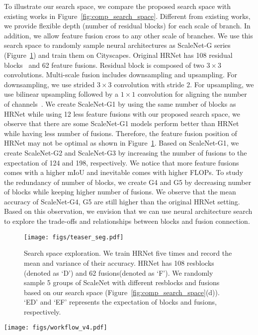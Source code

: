 \documentclass[final]{cvpr}
\newcommand{\workname}{ScaleNAS\xspace}
\newcommand{\netname}{ScaleNet\xspace}
\newcommand{\supernet}{SuperScaleNet\xspace}
\begin{document}
To illustrate our search space, we compare the proposed search space with existing works in Figure~\ref{fig:comp_search_space}.
Different from existing works, we provide flexible depth (number of residual blocks) for each scale of branch. In addition, we allow feature fusion cross to any other scale of branches.
We use this search space to randomly sample neural architectures as \netname-G series (Figure~\ref{fig:teaser_seg}) and train them on Cityscapes.
Original HRNet has 108 residual blocks~\cite{he2016deep} and 62 feature fusions. 
Residual block is composed of two $3\times3$ convolutions. Multi-scale fusion includes downsampling and upsampling. For downsampling, we use strided $3 \times 3$ convolution with stride 2. For upsampling, we use bilinear upsampling followed by a $1\times1$  convolution for aligning the number of channels~\cite{wang2020deep}.
We create ScaleNet-G1 by using the same number of blocks as HRNet while 
using 12 less feature fusions with our proposed search space, we observe that there are some ScaleNet-G1 models perform better than HRNet while having less number of fusions. Therefore, the feature fusion position of HRNet may not be optimal as shown in Figure~\ref{fig:teaser_seg}.
Based on \netname -G1, we create \netname -G2 and \netname -G3 by increasing the number of fusions to the expectation of 124 and 198, respectively. We notice that more feature fusions comes with a higher mIoU and inevitable comes with higher FLOPs. To study the redundancy of number of blocks, we create G4 and G5 by decreasing number of blocks while keeping higher number of fusions. We observe that the mean accuracy of \netname -G4, G5 are still higher than the original HRNet setting. Based on this observation, we envision that we can use neural architecture search to explore the trade-offs and relationships between blocks and fusion connection. 
\begin{figure}[h!]
    \centering
    \texttt{[image: figs/teaser\_seg.pdf]}
    \caption{Search space exploration. We train HRNet five times and record the mean and variance of their accuracy. HRNet has 108 resblocks (denoted as `D') and 62 fusions(denoted as `F'). We randomly sample 5 groups of \netname with different resblocks and fusions based on our search space (Figure~\ref{fig:comp_search_space}(d)). `ED' and `EF' represents the expectation of blocks and fusions, respectively. 
    }
    \label{fig:teaser_seg}
\end{figure} 


\begin{figure*}[ht]
    \centering
    \texttt{[image: figs/workflow\_v4.pdf]}
    \caption{Workflow of \workname.  \workname train a SuperScaleNet in the proposed search space and uses our proposed evolutionary method to explore elite architectures based on the trained SuperScaleNet.    (a) Before training starts, we initialize SuperScaleNet by the teacher model. (b) During each iteration, we sample ScaleNet from the SuperScaleNet. (c) We use the task loss from true labels and the knowledge distillation (KD) loss from soft labels given by teacher to update \supernet.}
    \label{fig:workflow}
\end{figure*}
\end{document}
